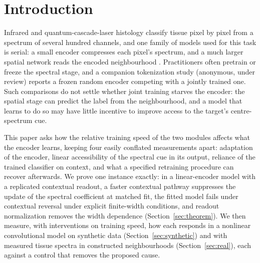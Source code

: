 \section{Introduction}
\label{sec:intro}

Infrared and quantum-cascade-laser histology classify tissue pixel by
pixel from a spectrum of several hundred channels, and one family of
models used for this task is serial: a small encoder compresses each
pixel's spectrum, and a much larger spatial network reads the encoded
neighbourhood \citep{berisha2019deep,oleary2026spatial}. Practitioners
often pretrain or freeze the spectral stage, and a companion tokenization
study (anonymous, under review) reports a frozen random encoder competing
with a jointly trained one. Such comparisons do not settle whether joint
training starves the encoder: the spatial stage can predict the label
from the neighbourhood, and a model that learns to do so may have little
incentive to improve access to the target's centre-spectrum cue.

This paper asks how the relative training speed of the two modules
affects what the encoder learns, keeping four easily conflated
measurements apart: adaptation of the encoder, linear accessibility of
the spectral cue in its output, reliance of the trained classifier on
context, and what a specified retraining procedure can recover afterwards.
We prove one instance exactly: in a linear-encoder model with a
replicated contextual readout, a faster contextual pathway suppresses the
update of the spectral coefficient at matched fit, the fitted model fails under contextual
reversal under explicit finite-width conditions, and readout normalization
removes the width dependence (Section~\ref{sec:theorem}). We then measure,
with interventions on training speed, how each responds in a nonlinear
convolutional model on synthetic data (Section~\ref{sec:synthetic}) and
with measured tissue spectra in constructed neighbourhoods
(Section~\ref{sec:real}), each against a control that removes the
proposed cause.

